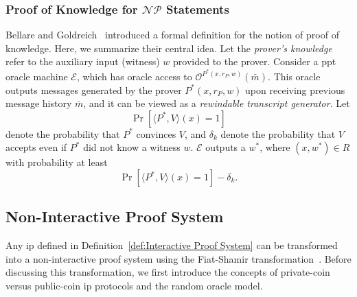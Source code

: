 \subsubsection{Proof of Knowledge for \texorpdfstring{$\mathcal{NP}$}{NP} Statements}

Bellare and Goldreich~\cite{Bellare1993ProofsofKnowledge} introduced a formal definition for the notion of proof of knowledge. Here, we summarize their central idea. Let the \textit{prover's knowledge} refer to the auxiliary input (witness) $w$ provided to the prover. Consider a \gls{ppt} oracle machine $\mathcal{E}$, which has oracle access to $\mathcal{O}^{P^*(x, r_P, w)}(\bar{m})$. This oracle outputs messages generated by the prover $P^*(x, r_P, w)$ upon receiving previous message history $\bar{m}$, and it can be viewed as a \textit{rewindable transcript generator}. Let 
\[
\Pr \left[ \langle P^*, V \rangle (x) = 1 \right]
\]
denote the probability that $P^*$ convinces $V$, and $\delta_k$ denote the probability that $V$ accepts even if $P^*$ did not know a witness $w$.  $\mathcal{E}$ outputs a $w^*$, where $(x, w^*) \in R$ with probability at least 
\[
\Pr \left[ \langle P^*, V \rangle (x) = 1 \right] - \delta_k.
\]



\subsection{Non-Interactive	Proof System}\label{sec:prel_non_interactive}
Any \gls{ip} defined in Definition~\ref{def:Interactive Proof System} can be transformed into a non-interactive proof system using the Fiat-Shamir transformation~\cite{Fiat1987}. Before discussing this transformation, we first introduce the concepts of private-coin versus public-coin \gls{ip} protocols and the random oracle model.

